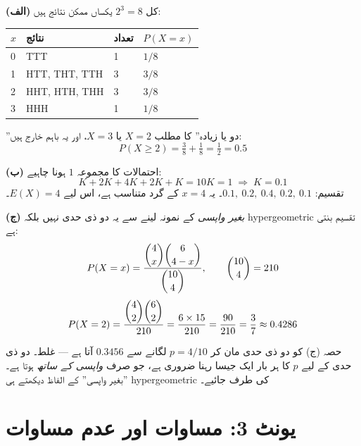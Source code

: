 \begin{hal}
\textbf{(الف)} کل \(2^{3}=8\) یکساں ممکن نتائج ہیں:

\begin{center}
\begin{tabular}{@{}p{1.3cm} p{4.6cm} p{1.5cm} p{2.4cm}@{}}
\toprule
\(x\) & نتائج & تعداد & \(P(X=x)\) \\
\midrule
\textenglish{0} & \textenglish{TTT}           & \textenglish{1} & \(1/8\) \\
\textenglish{1} & \textenglish{HTT, THT, TTH} & \textenglish{3} & \(3/8\) \\
\textenglish{2} & \textenglish{HHT, HTH, THH} & \textenglish{3} & \(3/8\) \\
\textenglish{3} & \textenglish{HHH}           & \textenglish{1} & \(1/8\) \\
\bottomrule
\end{tabular}
\end{center}

''دو یا زیادہ'' کا مطلب \(X=2\) یا \(X=3\)، اور یہ باہم خارج ہیں:
\[
P(X\ge 2)=\tfrac38+\tfrac18=\tfrac12=0.5
\]

\textbf{(ب)} احتمالات کا مجموعہ \(1\) ہونا چاہیے:
\[
K+2K+4K+2K+K=10K=1 \;\Longrightarrow\; K=0.1
\]
تقسیم: \(0.1,\ 0.2,\ 0.4,\ 0.2,\ 0.1\)۔ یہ \(x=4\) کے گرد متناسب ہے، اس لیے
\(E(X)=4\)۔

\textbf{(ج)} \emph{بغیر واپسی} کے نمونہ لینے سے یہ دو ذی حدی نہیں بلکہ
\textenglish{hypergeometric} تقسیم بنتی ہے:
\[
P(X=x)=\frac{\dbinom{4}{x}\dbinom{6}{4-x}}{\dbinom{10}{4}},
\qquad \dbinom{10}{4}=210
\]
\[
P(X=2)=\frac{\dbinom{4}{2}\dbinom{6}{2}}{210}=\frac{6\times 15}{210}
=\frac{90}{210}=\frac{3}{7}\approx 0.4286
\]

\end{hal}

\begin{ghalti}
حصہ (ج) کو دو ذی حدی مان کر \(p=4/10\) لگانے سے \(0.3456\) آتا ہے --- غلط۔ دو
ذی حدی کے لیے \(p\) کا ہر بار ایک جیسا رہنا ضروری ہے، جو صرف \emph{واپسی کے
ساتھ} ہوتا ہے۔ ''بغیر واپسی'' کے الفاظ دیکھتے ہی
\textenglish{hypergeometric} کی طرف جائیے۔
\end{ghalti}

\section*{یونٹ \textenglish{3}: مساوات اور عدم مساوات}

